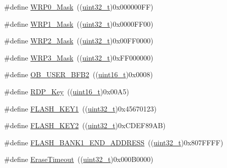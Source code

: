 \begin{DoxyCompactItemize}
\item 
\#define \hyperlink{group___f_l_a_s_h___private___defines_ga79707964cbd409601e1ddf6064cf1c5c}{W\+R\+P0\+\_\+\+Mask}~((\hyperlink{_p_e___types_8h_a33594304e786b158f3fb30289278f5af}{uint32\+\_\+t})0x000000\+F\+F)
\item 
\#define \hyperlink{group___f_l_a_s_h___private___defines_gaa2b2535ba91736dd2d6baa92068686e0}{W\+R\+P1\+\_\+\+Mask}~((\hyperlink{_p_e___types_8h_a33594304e786b158f3fb30289278f5af}{uint32\+\_\+t})0x0000\+F\+F00)
\item 
\#define \hyperlink{group___f_l_a_s_h___private___defines_ga4676f67c7be97a09eb1c6a5753ce0523}{W\+R\+P2\+\_\+\+Mask}~((\hyperlink{_p_e___types_8h_a33594304e786b158f3fb30289278f5af}{uint32\+\_\+t})0x00\+F\+F0000)
\item 
\#define \hyperlink{group___f_l_a_s_h___private___defines_ga649ce8b78520ca192b41aabe2daef035}{W\+R\+P3\+\_\+\+Mask}~((\hyperlink{_p_e___types_8h_a33594304e786b158f3fb30289278f5af}{uint32\+\_\+t})0x\+F\+F000000)
\item 
\#define \hyperlink{group___f_l_a_s_h___private___defines_ga5098bd938dadebbbdf9e628c84b2dcf0}{O\+B\+\_\+\+U\+S\+E\+R\+\_\+\+B\+F\+B2}~((\hyperlink{_p_e___types_8h_a1f1825b69244eb3ad2c7165ddc99c956}{uint16\+\_\+t})0x0008)
\item 
\#define \hyperlink{group___f_l_a_s_h___private___defines_ga34ec82060edcc9a18bf804b07dec5881}{R\+D\+P\+\_\+\+Key}~((\hyperlink{_p_e___types_8h_a1f1825b69244eb3ad2c7165ddc99c956}{uint16\+\_\+t})0x00\+A5)
\item 
\#define \hyperlink{group___f_l_a_s_h___private___defines_gafd77e7bf91765d891ce63e2f0084b019}{F\+L\+A\+S\+H\+\_\+\+K\+E\+Y1}~((\hyperlink{_p_e___types_8h_a33594304e786b158f3fb30289278f5af}{uint32\+\_\+t})0x45670123)
\item 
\#define \hyperlink{group___f_l_a_s_h___private___defines_gaee83d0f557e158da52f4a205db6b60a7}{F\+L\+A\+S\+H\+\_\+\+K\+E\+Y2}~((\hyperlink{_p_e___types_8h_a33594304e786b158f3fb30289278f5af}{uint32\+\_\+t})0x\+C\+D\+E\+F89\+A\+B)
\item 
\#define \hyperlink{group___f_l_a_s_h___private___defines_ga54cf78f1be63ba209709bf8f781ccd01}{F\+L\+A\+S\+H\+\_\+\+B\+A\+N\+K1\+\_\+\+E\+N\+D\+\_\+\+A\+D\+D\+R\+E\+SS}~((\hyperlink{_p_e___types_8h_a33594304e786b158f3fb30289278f5af}{uint32\+\_\+t})0x807\+F\+F\+F\+F)
\item 
\#define \hyperlink{group___f_l_a_s_h___private___defines_ga62b5515e9a29a487adcc30a88d082244}{Erase\+Timeout}~((\hyperlink{_p_e___types_8h_a33594304e786b158f3fb30289278f5af}{uint32\+\_\+t})0x000\+B0000)

\end{DoxyCompactItemize}
